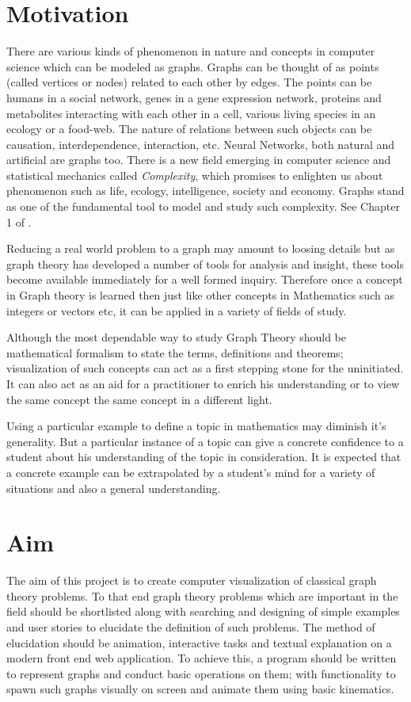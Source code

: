 
\section{Motivation}
There are various kinds of phenomenon in nature and concepts in computer science which can
be modeled as graphs. Graphs can be thought of as points (called vertices or
nodes) related to each other by edges. The points can be humans in a social
network, genes in a gene expression network, proteins and metabolites
interacting with each other in a cell, various living species in an ecology or
a food-web. The nature of relations between such objects can be causation,
interdependence, interaction, etc.  Neural Networks, both natural and
artificial are graphs too.  There is a new field emerging in computer science
and statistical mechanics called \emph{Complexity}, which promises to enlighten
us about phenomenon such as life, ecology, intelligence, society and economy.
Graphs stand as one of the fundamental tool to model and study such complexity.
See Chapter 1 of \cite{Gros2015}.

Reducing a real world problem to a graph may amount to loosing details but as
graph theory has developed a number of tools for analysis and insight, these
tools become available immediately for a well formed inquiry. Therefore once a
concept in Graph theory is learned then just like other concepts in Mathematics
such as integers or vectors etc, it can be applied in a variety of fields of
study.

Although the most dependable way to study Graph Theory should be mathematical
formalism to state the terms, definitions and theorems; visualization of such
concepts can act as a first stepping stone for the uninitiated. It can also act
as an aid for a practitioner to enrich his understanding or to view the same
concept the same concept in a different light.

Using a particular example to define a topic in mathematics may diminish it's
generality. But a particular instance of a topic can give a concrete confidence
to a student about his understanding of the topic in consideration. It is
expected that a concrete example can be extrapolated by a student's mind for a
variety of situations and also a general understanding.

\section{Aim}
The aim of this project is to create computer visualization of classical graph
theory problems. To that end graph theory problems which are important in the
field should be shortlisted along with searching and designing of simple
examples and user stories to elucidate the definition of such problems.
The method of elucidation should be animation, interactive tasks and textual
explanation on a modern front end web application. To achieve this, a program
should be written to represent graphs and conduct basic operations on them;
with functionality to spawn such graphs visually on screen and
animate them using basic kinematics.


